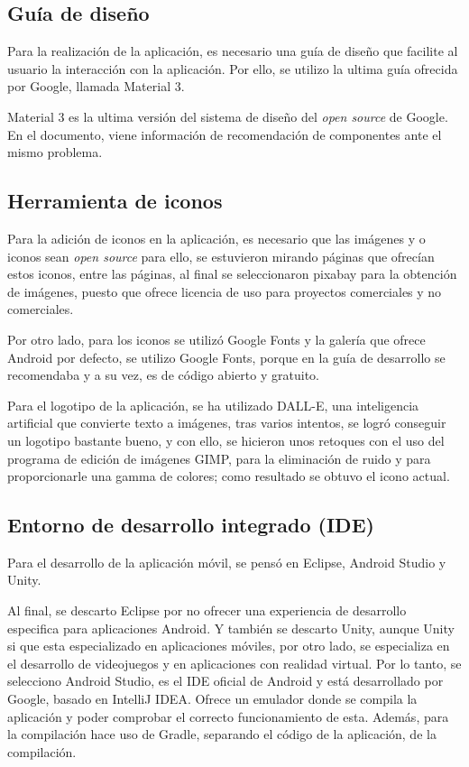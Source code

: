     \subsection{Guía de diseño}
        Para la realización de la aplicación, es necesario una guía de diseño que facilite al usuario la interacción con la aplicación. Por ello, se utilizo la ultima guía ofrecida por Google, llamada Material 3.

        Material 3 es la ultima versión del sistema de diseño del \textit{open source} de Google.
        En el documento, viene información de recomendación de componentes ante el mismo problema.

    \subsection{Herramienta de iconos}
        Para la adición de iconos en la aplicación, es necesario que las imágenes y o iconos sean \textit{open source} para ello, se estuvieron mirando páginas que ofrecían estos iconos, entre las páginas, al final se seleccionaron pixabay para la obtención de imágenes, puesto que ofrece licencia de uso para proyectos comerciales y no comerciales.

        Por otro lado, para los iconos se utilizó Google Fonts y la galería que ofrece Android por defecto, se utilizo Google Fonts, porque en la guía de desarrollo se recomendaba y a su vez, es de código abierto y gratuito.

        Para el logotipo de la aplicación, se ha utilizado DALL-E, una inteligencia artificial que convierte texto a imágenes, tras varios intentos, se logró conseguir un logotipo bastante bueno, y con ello, se hicieron unos retoques con el uso del programa de edición de imágenes GIMP, para la eliminación de ruido y para proporcionarle una gamma de colores; como resultado se obtuvo el icono actual.

    \subsection{Entorno de desarrollo integrado (IDE)}
        Para el desarrollo de la aplicación móvil, se pensó en Eclipse, Android Studio y Unity.

        Al final, se descarto Eclipse por no ofrecer una experiencia de desarrollo especifica para aplicaciones Android. Y también se descarto Unity, aunque Unity si que esta especializado en aplicaciones móviles, por otro lado, se especializa en el desarrollo de videojuegos y en aplicaciones con realidad virtual.
        Por lo tanto, se selecciono Android Studio, es el IDE oficial de Android y está desarrollado por Google, basado en IntelliJ IDEA. Ofrece un emulador donde se compila la aplicación y poder comprobar el correcto funcionamiento de esta.
        Además, para la compilación hace uso de Gradle, separando el código de la aplicación, de la compilación.

